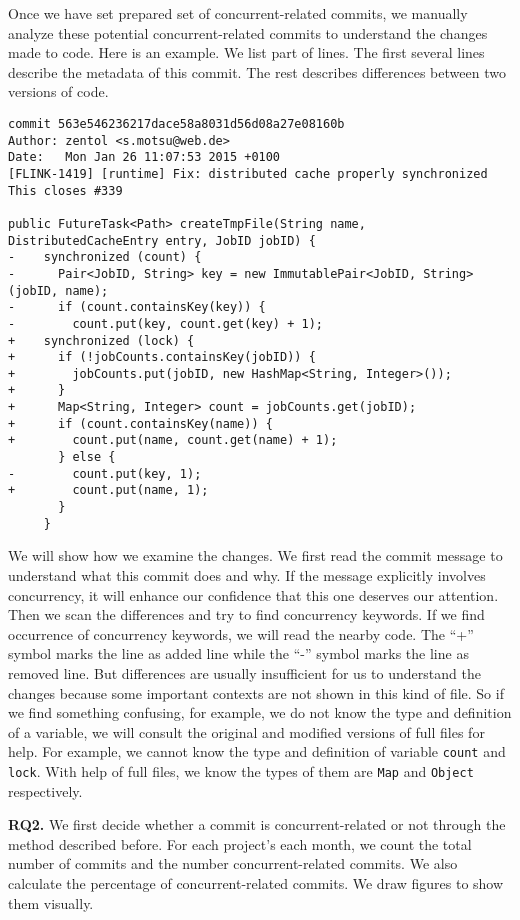 Once we have set prepared set of concurrent-related commits, we manually analyze these potential concurrent-related commits to understand the changes made to code. Here is an example. We list part of lines. The first several lines describe the metadata of this commit. The rest describes differences between two versions of code.

\begin{lstlisting}
commit 563e546236217dace58a8031d56d08a27e08160b
Author: zentol <s.motsu@web.de>
Date:   Mon Jan 26 11:07:53 2015 +0100
[FLINK-1419] [runtime] Fix: distributed cache properly synchronized
This closes #339

public FutureTask<Path> createTmpFile(String name, DistributedCacheEntry entry, JobID jobID) {
-    synchronized (count) {
-      Pair<JobID, String> key = new ImmutablePair<JobID, String>(jobID, name);
-      if (count.containsKey(key)) {
-        count.put(key, count.get(key) + 1);
+    synchronized (lock) {
+      if (!jobCounts.containsKey(jobID)) {
+        jobCounts.put(jobID, new HashMap<String, Integer>());
+      }
+      Map<String, Integer> count = jobCounts.get(jobID);
+      if (count.containsKey(name)) {
+        count.put(name, count.get(name) + 1);
       } else {
-        count.put(key, 1);
+        count.put(name, 1);
       }
     }
\end{lstlisting}

We will show how we examine the changes. We first read the commit message to understand what this commit does and why. If the message explicitly involves concurrency, it will enhance our confidence that this one deserves our attention. Then we scan the differences and try to find concurrency keywords. If we find occurrence of concurrency keywords, we will read the nearby code. The ``+'' symbol marks the line as added line while the ``-'' symbol marks the line as removed line. But differences are usually insufficient for us to understand the changes because some important contexts are not shown in this kind of file. So if we find something confusing, for example, we do not know the type and definition of a variable, we will consult the original and modified versions of full files for help. For example, we cannot know the type and definition of variable \texttt{count} and \texttt{lock}. With help of full files, we know the types of them are \texttt{Map} and \texttt{Object} respectively.

\textbf{RQ2.} We first decide whether a commit is concurrent-related or not through the method described before. For each project's each month, we count the total number of commits and the number concurrent-related commits. We also calculate the percentage of concurrent-related commits. We draw figures to show them visually.

